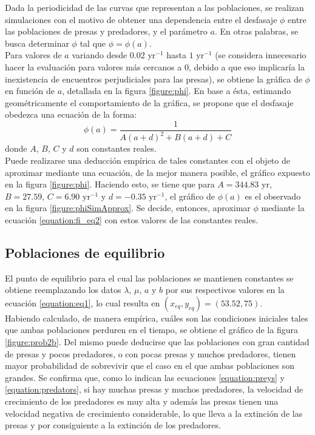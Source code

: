 \documentclass[journal, monochrome]{IEEEtran}
\begin{document}
Dada la periodicidad de las curvas que representan a las poblaciones, se realizan simulaciones con el motivo de obtener una dependencia 
entre el desfasaje $\phi$ entre las poblaciones de presas y predadores, y el parámetro $a$. En otras palabras, se busca determinar $\phi$ tal que $\phi = \phi(a)$.\\

Para valores de $a$ variando desde $0.02 \text{ yr}^{-1}$ hasta $1 \text{ yr}^{-1}$ (se considera innecesario hacer la evaluación para valores más cercanos a $0$, debido a que eso implicaría la inexistencia de encuentros 
perjudiciales para las presas), se obtiene la gráfica de $\phi$ en función de $a$, detallada en la figura \ref{figure:phi}.
En base a ésta, estimando geométricamente el comportamiento de la gráfica, se propone que el desfasaje obedezca una ecuación de la forma:
\begin{equation}
\phi(a) = \frac{1}{A (a + d)^2 + B (a + d) + C}
\label{equation:fi_eq2}
\end{equation}
donde $A$, $B$, $C$ y $d$ son constantes reales.\\

Puede realizarse una deducción empírica de tales constantes con el objeto de aproximar mediante una ecuación, de la mejor manera posible, el gráfico expuesto en la figura \ref{figure:phi}. Haciendo esto, se 
tiene que para $A = 344.83 \text{ yr}$, $B = 27.59$, $C = 6.90 \text{ yr}^{-1}$ y $d = -0.35 \text{ yr}^{-1}$, el gráfico de $\phi(a)$ es el observado en la figura \ref{figure:phiSimApprox}.
Se decide, entonces, aproximar $\phi$ mediante la ecuación \ref{equation:fi_eq2} con estos valores de las constantes reales.



\subsection{Poblaciones de equilibrio}

El punto de equilibrio para el cual las poblaciones se mantienen constantes se obtiene reemplazando los datos $\lambda$, $\mu$, $a$ y $b$ por sus respectivos valores en la ecuación \ref{equation:eq1}, 
lo cual resulta en $(x_{eq}, y_{eq}) = (53.52, 75)$. \\

Habiendo calculado, de manera empírica, cuáles son las condiciones iniciales tales que ambas poblaciones perduren en el tiempo, se obtiene el gráfico de la figura \ref{figure:prob2b}. Del mismo puede deducirse que las poblaciones con gran cantidad de presas y pocos predadores, o con pocas presas y muchos predadores, tienen mayor probabilidad de sobrevivir que el caso en el que ambas poblaciones son grandes. Se confirma que, como lo indican las ecuaciones \ref{equation:preys} y \ref{equation:predators}, si hay muchas presas y muchos predadores, la velocidad de crecimiento de los predadores es muy alta y además las presas tienen una velocidad negativa de crecimiento considerable, lo que lleva a la extinción de las presas y por consiguiente a la extinción de los predadores.
\end{document}
